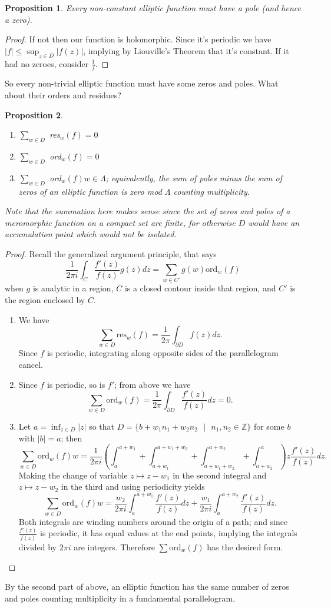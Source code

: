 \documentclass{article}
\newtheorem{proposition}{Proposition}
\theoremstyle{remark}
\begin{document}
\begin{proposition}
Every non-constant elliptic function must have a pole (and hence a zero).
\end{proposition}
\begin{proof}
If not then our function is holomorphic. Since it's periodic we have $|f|\leq \sup_{z\in \bar{D}}|f(z)|$, implying by Liouville's Theorem that it's constant. If it had no zeroes, consider $\frac{1}{f}$.
\end{proof}
So every non-trivial elliptic function must have some zeros and poles. What about their orders and residues?
\begin{proposition}
\begin{enumerate}
\item $\sum_{w\in D}$ res$_w (f)=0$
\item $\sum_{w\in D}$ ord$_w (f)=0$
\item $\sum_{w\in D}$ ord$_w (f)w\in\Lambda$; equivalently, the sum of poles minus the sum of zeros of an elliptic function is zero mod $\Lambda$ counting multiplicity.
\end{enumerate}
Note that the summation here makes sense since the set of zeros and poles of a meromorphic function on a compact set are finite, for otherwise $D$ would have an accumulation point which would not be isolated.
\end{proposition}
\begin{proof}
Recall the generalized argument principle, that says
\[\frac{1}{2\pi i}\int_C \frac{f'(z)}{f(z)}g(z) dz=\sum_{w\in C'}g(w)\text{ord}_w(f)\]
when $g$ is analytic in a region, $C$ is a closed contour inside that region, and $C'$ is the region enclosed by $C$.
\begin{enumerate}
\item We have 
\[ \sum_{w\in D} \text{res}_w (f)=\frac{1}{2\pi}\int_{\partial D}^{}f(z) dz.\]
Since $f$ is periodic, integrating along opposite sides of the parallelogram cancel.
\item Since $f$ is periodic, so is $f'$; from above we have
\[ \sum_{w\in D}\text{ord}_w (f)=\frac{1}{2\pi}\int_{\partial D}\frac{f'(z)}{f(z)} dz=0.\]
\item Let $a=\inf_{z\in D}|z|$ so that $D=\{b+w_1n_1+w_2n_2\text{ }|\text{ }n_1,n_2\in\mathbb{Z}\}$ for some $b$ with $|b|=a$; then
\[ \sum_{w\in D} \text{ord}_w (f)w=\frac{1}{2\pi i}\left( \int_a^{a+w_1}+\int_{a+w_1}^{a+w_1+w_2}+\int_{a+w_1+w_2}^{a+w_2}+\int_{a+w_2}^{a} \right)z\frac{f'(z)}{f(z)}dz.\]
Making the change of variable $z\mapsto z-w_1$ in the second integral and $z\mapsto z-w_2$ in the third and using periodicity yields
\[\sum_{w\in D} \text{ord}_w (f)w=\frac{w_2}{2\pi i}\int_a^{a+w_1}\frac{f'(z)}{f(z)}dz+\frac{w_1}{2\pi i}\int_a^{a+w_2}\frac{f'(z)}{f(z)}dz. \]
Both integrals are winding numbers around the origin of a path; and since $\frac{f'(z)}{f(z)}$ is periodic, it has equal values at the end points, implying the integrals divided by $2\pi i$ are integers. Therefore $\sum$ord$_w(f)$ has the desired form.
\end{enumerate}
\end{proof}
By the second part of above, an elliptic function has the same number of zeros and poles counting multiplicity in a fundamental parallelogram.
\end{document}
